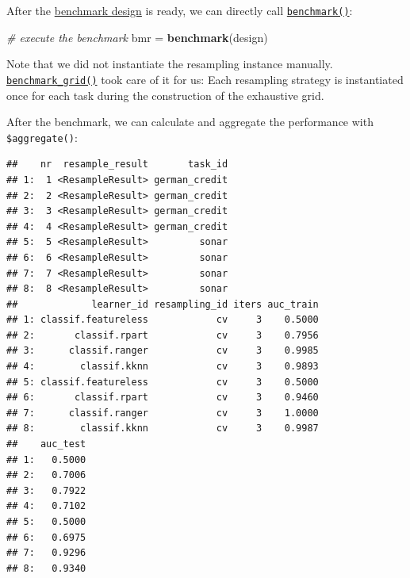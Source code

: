 \documentclass[]{article}
\newenvironment{Shaded}{\begin{snugshade}}{\end{snugshade}}
\newcommand{\CommentTok}[1]{\textcolor[rgb]{0.56,0.35,0.01}{\textit{#1}}}
\newcommand{\DataTypeTok}[1]{\textcolor[rgb]{0.13,0.29,0.53}{#1}}
\newcommand{\KeywordTok}[1]{\textcolor[rgb]{0.13,0.29,0.53}{\textbf{#1}}}
\newcommand{\NormalTok}[1]{#1}
\newcommand{\OperatorTok}[1]{\textcolor[rgb]{0.81,0.36,0.00}{\textbf{#1}}}
\newcommand{\StringTok}[1]{\textcolor[rgb]{0.31,0.60,0.02}{#1}}
\renewenvironment{Shaded} {\begin{snugshade}\small} {\end{snugshade}}
\begin{document}
After the \protect\hyperlink{bm-design}{benchmark design} is ready, we can directly call \href{https://mlr3.mlr-org.com/reference/benchmark.html}{\texttt{benchmark()}}:

\begin{Shaded}
\begin{Highlighting}[]
\CommentTok{# execute the benchmark}
\NormalTok{bmr =}\StringTok{ }\KeywordTok{benchmark}\NormalTok{(design)}
\end{Highlighting}
\end{Shaded}

Note that we did not instantiate the resampling instance manually.
\href{https://mlr3.mlr-org.com/reference/benchmark_grid.html}{\texttt{benchmark\_grid()}} took care of it for us:
Each resampling strategy is instantiated once for each task during the construction of the exhaustive grid.

After the benchmark, we can calculate and aggregate the performance with \texttt{\$aggregate()}:

\begin{Shaded}
\end{Shaded}

\begin{verbatim}
##    nr  resample_result       task_id
## 1:  1 <ResampleResult> german_credit
## 2:  2 <ResampleResult> german_credit
## 3:  3 <ResampleResult> german_credit
## 4:  4 <ResampleResult> german_credit
## 5:  5 <ResampleResult>         sonar
## 6:  6 <ResampleResult>         sonar
## 7:  7 <ResampleResult>         sonar
## 8:  8 <ResampleResult>         sonar
##             learner_id resampling_id iters auc_train
## 1: classif.featureless            cv     3    0.5000
## 2:       classif.rpart            cv     3    0.7956
## 3:      classif.ranger            cv     3    0.9985
## 4:        classif.kknn            cv     3    0.9893
## 5: classif.featureless            cv     3    0.5000
## 6:       classif.rpart            cv     3    0.9460
## 7:      classif.ranger            cv     3    1.0000
## 8:        classif.kknn            cv     3    0.9987
##    auc_test
## 1:   0.5000
## 2:   0.7006
## 3:   0.7922
## 4:   0.7102
## 5:   0.5000
## 6:   0.6975
## 7:   0.9296
## 8:   0.9340
\end{verbatim}
\end{document}
